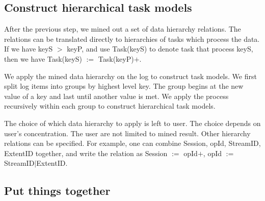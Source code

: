 \subsection{Construct hierarchical task models}


After the previous step, we mined out a set of data
hierarchy relations. The relations can be translated
directly to hierarchies of tasks which process the data. 
If we have keyS $>$ keyP, and use Task(keyS) to denote task
that process keyS, then we have Task(keyS) $:=$
Task(keyP)$+$.

We apply the mined data hierarchy on the log to construct
task models. We first split log items into groups by highest
level key. The group begins at the new value of a key and
last until another value is met. We apply the process
recursively within each group to construct hierarchical task
models.


The choice of which data hierarchy to apply is left to user.
The choice depends on user's concentration. The user are not
limited to mined result. Other hierarchy relations can be
specified. For example, one can combine Session, opId,
StreamID, ExtentID together, and write the relation as
Session $:=$ opId$+$, opId $:=$ StreamID$|$ExtentID.


\subsection{Put things together}


